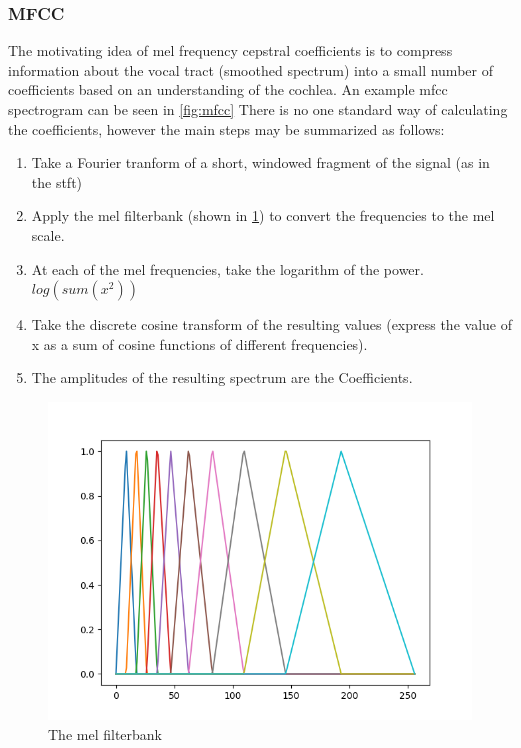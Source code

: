 \documentclass[11pt]{article}
\begin{document}
\subsubsection{MFCC}
\label{sec:org657745a}

The motivating idea of mel frequency cepstral coefficients is to compress information about the vocal tract (smoothed spectrum) into a small number of coefficients based on an understanding of the cochlea. An example mfcc spectrogram can be seen in \ref{fig:mfcc} There is no one standard way of calculating the coefficients, however the main steps may be summarized as follows:

\begin{enumerate}
    \item Take a Fourier tranform of a short, windowed fragment of the signal (as in the stft)
    \item Apply the mel filterbank (shown in \ref{fig:mel_filterbank}) to convert the frequencies to the mel scale.
    \item At each of the mel frequencies, take the logarithm of the power. $log(sum(x^{2}))$
    \item Take the discrete cosine transform of the resulting values (express the value of x as a sum of cosine functions of different frequencies).
    \item The amplitudes of the resulting spectrum are the Coefficients.
\end{enumerate}

\begin{figure}[h!]
\centering
\includegraphics[width=\textwidth]{./Figures/mel_filterbank.png}
\caption{\label{fig:mel_filterbank}The mel filterbank}
\end{figure}
\end{document}
